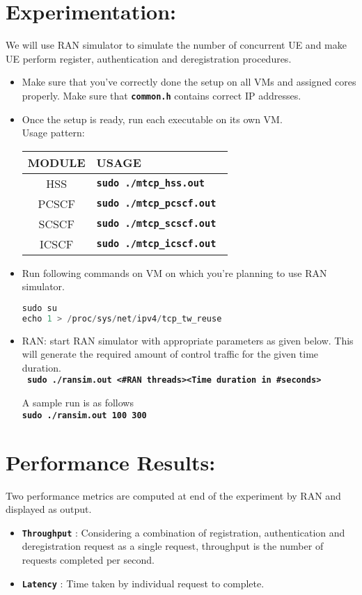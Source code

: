 \documentclass[hidelinks]{report}
\newcommand{\cf}[1] {
	\textbf{\texttt{#1}}
}
\begin{document}
\section*{Experimentation:}
We will use RAN simulator to simulate the number of concurrent UE and make UE perform register, authentication and deregistration procedures.

\begin{itemize}
\item Make sure that you've correctly done the setup on all VMs and assigned cores properly. Make sure that \cf{common.h} contains correct IP addresses.
\item Once the setup is ready, run each executable on its own VM.\\
Usage pattern: 
\begin{center}

\label{bin_format}
\def\arraystretch{1.5}

\begin{tabular}{|c|p{11.5 cm}|}

\hline
\textbf{MODULE} & \textbf{USAGE} \\
\hline
HSS & \cf{sudo ./mtcp\_hss.out } \\
PCSCF & \cf{sudo ./mtcp\_pcscf.out } \\
SCSCF & \cf{sudo ./mtcp\_scscf.out } \\
ICSCF & \cf{sudo ./mtcp\_icscf.out } \\
\hline

\end{tabular}
\end{center}

\item Run following commands on VM on which you're planning to use RAN simulator.
\begin{lstlisting}[language=c]
sudo su
echo 1 > /proc/sys/net/ipv4/tcp_tw_reuse 
\end{lstlisting}
\item RAN: start RAN simulator with appropriate parameters as given below. This will generate the required amount of control traffic for the given time duration. \\
\cf{
sudo ./ransim.out \textless \#RAN threads\textgreater \textless Time duration in \#seconds\textgreater\\}
A sample run is as follows \\
\cf{sudo ./ransim.out 100 300 }
\end{itemize}

\section*{Performance Results:}
Two performance metrics are computed at end of the experiment by RAN and displayed as output.
\begin{itemize}
\item \cf{Throughput}: Considering a combination of registration, authentication and deregistration request as a single request, throughput is the number of requests completed per second.
\item \cf{Latency}: Time taken by individual request to complete.
\end{itemize}
\end{document}
